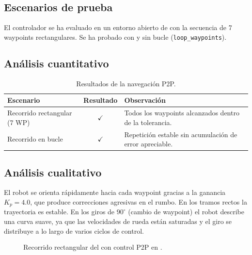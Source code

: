\documentclass[12pt]{article}
\begin{document}
\subsection{Escenarios de prueba}
El controlador se ha evaluado en un entorno abierto de \coppelia{} con la secuencia de 7 waypoints rectangulares. Se ha probado con y sin bucle (\texttt{loop\_waypoints}).

\subsection{An\'{a}lisis cuantitativo}

\begin{table}[H]
  \centering
  \caption{Resultados de la navegaci\'{o}n P2P.}
  \label{tab:resultados}
  \begin{tabularx}{0.98\linewidth}{l c X}
    \toprule
    \textbf{Escenario} & \textbf{Resultado} & \textbf{Observaci\'{o}n} \\
    \midrule
    Recorrido rectangular (7 WP) & $\checkmark$ & Todos los waypoints alcanzados dentro de la tolerancia. \\
    Recorrido en bucle            & $\checkmark$ & Repetici\'{o}n estable sin acumulaci\'{o}n de error apreciable. \\
    \bottomrule
  \end{tabularx}
\end{table}

\subsection{An\'{a}lisis cualitativo}
El robot se orienta r\'{a}pidamente hacia cada waypoint gracias a la ganancia $K_p = 4.0$, que produce correcciones agresivas en el rumbo. En los tramos rectos la trayectoria es estable. En los giros de $90^\circ$ (cambio de waypoint) el robot describe una curva suave, ya que las velocidades de rueda est\'{a}n saturadas y el giro se distribuye a lo largo de varios ciclos de control.

\begin{figure}[H]
  \centering
  \caption{Recorrido rectangular del \pioneer{} con control P2P en \coppelia{}.}
  \label{fig:p2p_recorrido}
\end{figure}
\end{document}
